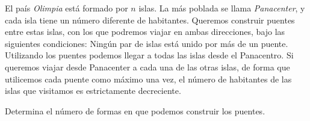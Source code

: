 El país {\itshape Olimpia} está formado por $n$ islas. La más poblada se llama {\itshape Panacenter}, y cada isla tiene un número diferente de habitantes. Queremos construir puentes entre estas islas, con los que podremos viajar en ambas direcciones, bajo las siguientes condiciones: Ningún par de islas está unido por más de un puente. Utilizando los puentes podemos llegar a todas las islas desde el Panacentro. Si queremos viajar desde Panacenter a cada una de las otras islas, de forma que utilicemos cada puente como máximo una vez, el número de habitantes de las islas que visitamos es estrictamente decreciente.




Determina el número de formas en que podemos construir los puentes.

